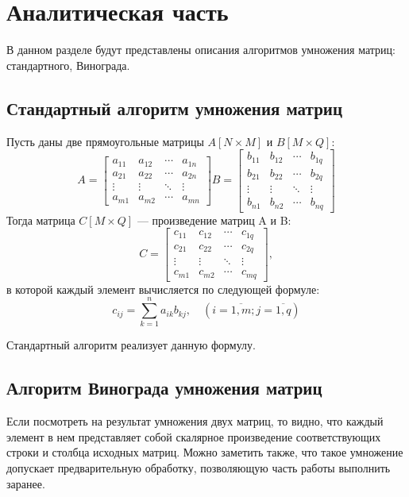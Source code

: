 \chapter{Аналитическая часть}
В данном разделе будут представлены описания алгоритмов умножения матриц: стандартного, Винограда.

\section{Стандартный алгоритм умножения матриц}

Пусть даны две прямоугольные матрицы $A[N \times M]$ и $B[M \times Q]$:
$$
A = 
\begin{bmatrix} 
	a_{11} & a_{12} & \cdots & a_{1n} \\
	a_{21} & a_{22} & \cdots & a_{2n} \\ 
	\vdots & \vdots & \ddots & \vdots \\ 
	a_{m1} & a_{m2} & \cdots & a_{mn}
\end{bmatrix}
B =   
\begin{bmatrix} 
	b_{11} & b_{12} & \cdots & b_{1q} \\
	b_{21} & b_{22} & \cdots & b_{2q} \\ 
	\vdots & \vdots & \ddots & \vdots \\ 
	b_{n1} & b_{n2} & \cdots & b_{nq}
\end{bmatrix}
$$
Тогда матрица $C[M \times Q]$ --- произведение матриц A и B:
$$
C = 
\begin{bmatrix} 
	c_{11} & c_{12} & \cdots & c_{1q} \\
	c_{21} & c_{22} & \cdots & c_{2q} \\ 
	\vdots & \vdots & \ddots & \vdots \\ 
	c_{m1} & c_{m2} & \cdots & c_{mq}
\end{bmatrix},
$$
в которой каждый элемент вычисляется по следующей формуле: 
\begin{equation}
	\label{eq:N}
	c_{ij} =
	\sum_{k=1}^{n} a_{ik}b_{kj}, \quad (i=\overline{1,m}; j=\overline{1,q})
\end{equation}

Стандартный алгоритм реализует данную формулу.


\section{Алгоритм Винограда умножения матриц}
Если посмотреть на результат умножения двух матриц, то видно, что каждый элемент в нем представляет собой скалярное произведение соответствующих строки и столбца исходных матриц.
Можно заметить также, что такое умножение допускает предварительную обработку, позволяющую часть работы выполнить заранее.

